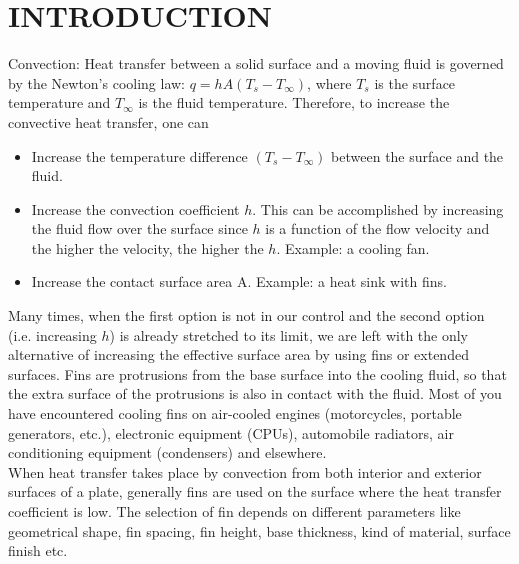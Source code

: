 %       
%
\tableofcontents
{}
\listoffigures
{}
\listoftables

\mainmatter



\chapter {INTRODUCTION}


{   Convection: Heat transfer between a solid surface and a moving fluid is governed by the Newton’s cooling law: $ q = hA(T_s-T_\infty) $, where $T_s$ is the surface temperature and $T_\infty$ is the fluid temperature. Therefore, to increase the convective heat transfer, one can               }

  \begin{itemize}
  	\item{Increase the temperature difference $ (T_s-T_\infty) $ between the surface and the fluid.}
  	\item{Increase the convection coefficient $ h $. This can be accomplished by increasing the fluid flow over the surface since $ h $ is a function of the flow velocity and the higher the velocity, the higher the $ h $. Example: a cooling fan. }
  	\item{Increase the contact surface area A. Example: a heat sink with fins.}
 
  \end{itemize}
  
  Many times, when the first option is not in our control and the second option (i.e. increasing $ h $) is already stretched to its limit, we are left with the only alternative of increasing the effective surface area by using fins or extended surfaces. Fins are protrusions from the base surface into the cooling fluid, so that the extra surface of the protrusions is also in contact with the fluid. Most of you have encountered cooling fins on air-cooled engines (motorcycles, portable generators, etc.), electronic equipment (CPUs), automobile radiators, air conditioning equipment (condensers) and elsewhere.
\\
When heat transfer takes place by convection from
both interior and exterior surfaces of a plate,
generally fins are used on the surface where the heat
transfer coefficient is low. The selection of fin
depends on different parameters like geometrical
shape, fin spacing, fin height, base thickness, kind of
material, surface finish etc.
